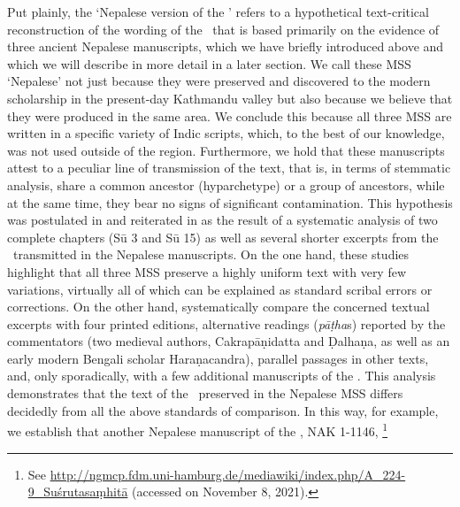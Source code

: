 Put plainly, the `Nepalese version of the \SS' refers to a hypothetical text-critical reconstruction of the wording of the \SS\ that is based primarily on the evidence of three ancient Nepalese manuscripts, which we have briefly introduced above and which we will describe in more detail in a later section.  We call these MSS `Nepalese' not just because they were preserved and discovered to the modern scholarship in the present-day Kathmandu valley but also because we believe that they were produced in the same area. We conclude this because all three MSS are written in a specific variety of Indic scripts, which, to the best of our knowledge, was not used outside of the region. 
Furthermore, we hold that these manuscripts attest to a peculiar line of transmission of the text, that is, in terms of stemmatic analysis, share a common ancestor (hyparchetype) or a group of ancestors, while at the same time, they bear no signs of significant contamination. This hypothesis was postulated in \citet{kleb-2010} and reiterated in \citet{kleb-2021a} as the result of a systematic analysis of two complete chapters (Sū 3 and Sū 15) as well as several shorter excerpts from the \SS\ transmitted in the Nepalese manuscripts. 
On the one hand, these studies highlight that all three MSS preserve a highly uniform text with very few variations, virtually all of which can be explained as standard scribal errors or corrections. 
On the other hand, \citet{kleb-2010,kleb-2021a} systematically compare the concerned textual excerpts with four printed editions, alternative readings (\emph{pāṭha}s) reported by the commentators (two medieval authors, Cakrapāṇidatta and Ḍalhaṇa, as well as an early modern Bengali scholar Haraṇacandra), parallel passages in other texts, and, only sporadically, with a few additional manuscripts of the \SS. This analysis demonstrates that the text of the \SS\ preserved in the Nepalese MSS differs decidedly from all the above standards of comparison. In this way, for example, we establish that another Nepalese manuscript of the \SS, NAK 1-1146,%
    \footnote{%
    See 
    \url{http://ngmcp.fdm.uni-hamburg.de/mediawiki/index.php/A_224-9_Suśrutasaṃhitā}
     (accessed on November 8, 2021).%
    } 
